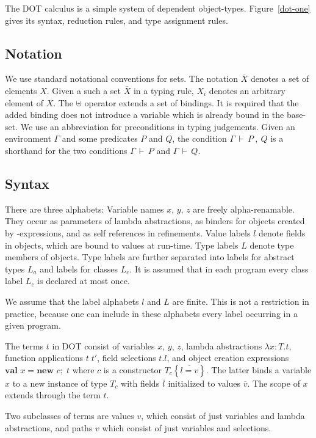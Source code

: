 \documentclass{llncs}
\renewcommand{\ts}{\,\vdash\,}
\newcommand{\spcomma}{~,~}
\newcommand{\ldefs}[1]{\left\{#1\right\}}
\newcommand{\seq}[1]{\overline{#1}}
\newcommand{\abs}[3]{\lambda #1\!:\!#2.#3}
\newcommand{\app}[2]{#1\;#2}
\newcommand{\new}[3]{\textbf{val }#1 = \textbf{new }#2 ;\; #3}
\begin{document}
The DOT calculus is a simple system of dependent
object-types. Figure~\ref{dot-one} gives its syntax, reduction rules,
and type assignment rules.

\subsection*{Notation} We use standard notational conventions for
sets. The notation $\seq{X}$ denotes a set of elements $X$. Given a
such a set $\seq X$ in a typing rule, $X_i$ denotes an arbitrary
element of $X$. 
The $\uplus$ operator extends a set of bindings. It is required that the added binding does not
introduce a variable which is already bound in the base-set. 
We use an
abbreviation for preconditions in typing judgements. Given an
environment $\Gamma$ and some predicates $P$ and $Q$, the condition $\Gamma \ts P \spcomma Q$
is a shorthand for the two conditions $\Gamma \ts P$ and $\Gamma \ts Q$.

\subsection*{Syntax}

There are three alphabets: Variable names $x$, $y$, $z$ are freely
alpha-renamable. They occur as parameters of lambda abstractions, as
binders for objects created by \verb@new@-expressions, and as self
references in refinements. Value labels $l$ denote fields in objects,
which are bound to values at run-time. Type labels $L$ denote type
members of objects. Type labels are further separated into labels for
abstract types $L_a$ and labels for classes $L_c$. It is assumed that
in each program every class label $L_c$ is declared at most once.

We assume that the label alphabets $l$ and $L$ are finite. This is
not a restriction in practice, because one can include in these 
alphabets every label occurring in a given program.

The terms $t$ in DOT consist of variables $x$, $y$, $z$, lambda
abstractions $\abs x T t$, function applications $\app t {t'}$, field
selections $t.l$, and object creation expressions $\new x c t$ where
$c$ is a constructor $T_c \ldefs{\seq{l = v}}$. The latter binds a
variable $x$ to a new instance of type $T_c$ with fields $\seq l$ initialized to values $\seq v$.  The scope of $x$ extends through the term $t$.

Two subclasses of terms are values $v$, which consist of just
variables and lambda abstractions, and paths $v$ which consist of just
variables and selections.
\end{document}

